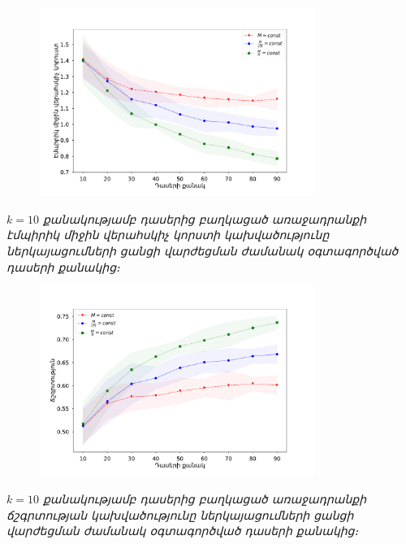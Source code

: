 \documentclass[10pt]{beamer}
\begin{document}
\begin{frame}
\begin{figure}[htp]
\centering
\includegraphics[width=0.8\textwidth]{imgs/k=10.pdf}
\end{figure}
\begin{center}
 \fontsize{7pt}{7pt} 
\armfont \textit{$k=10$ քանակությամբ դասերից բաղկացած առաջադրանքի էմպիրիկ միջին վերահսկիչ կորստի կախվածությունը ներկայացումների ցանցի վարժեցման ժամանակ  օգտագործված դասերի քանակից։}
\end{center}
\end{frame}


\begin{frame}
\begin{figure}[htp]
\centering
\includegraphics[width=0.8\textwidth]{imgs/k=10_acc.pdf}
\end{figure}
\begin{center}
 \fontsize{7pt}{7pt} 
\armfont \textit{$k=10$ քանակությամբ դասերից բաղկացած առաջադրանքի ճշգրտության կախվածությունը ներկայացումների ցանցի վարժեցման ժամանակ  օգտագործված դասերի քանակից։}
\end{center}
\end{frame}
\end{document}
